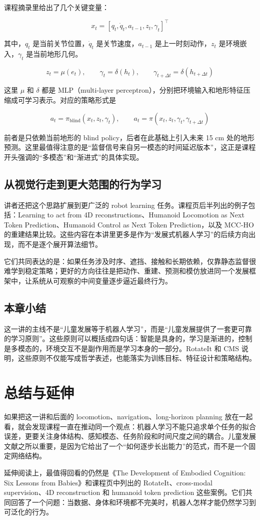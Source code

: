 \documentclass[a4paper]{article}
\begin{document}
课程摘录里给出了几个关键变量：

\[
x_t = [q_t, \dot q_t, a_{t-1}, z_t, \gamma_t]^\top
\]

其中，\(q_t\) 是当前关节位置，\(\dot q_t\) 是关节速度，\(a_{t-1}\) 是上一时刻动作，\(z_t\) 是环境嵌入，\(\gamma_t\) 是当前地形几何。

\[
z_t = \mu(e_t), \qquad \gamma_t = \delta(h_t), \qquad \gamma_{t+\Delta t} = \delta(h_{t+\Delta t})
\]

这里 \(\mu\) 和 \(\delta\) 都是 MLP（multi-layer perceptron），分别把环境输入和地形特征压缩成可学习表示。对应的策略形式是

\[
a_t = \pi_{\text{blind}}(x_t, z_t, \gamma_t), \qquad
a_t = \pi(x_t, z_t, \gamma_t, \gamma_{t+\Delta t})
\]

前者是只依赖当前地形的 blind policy，后者在此基础上引入未来 15 cm 处的地形预测。这里最值得注意的是“监督信号来自另一模态的时间延迟版本”，这正是课程开头强调的“多模态”和“渐进式”的具体实现。

\subsection{从视觉行走到更大范围的行为学习}
讲者还把这个思路扩展到更广泛的 robot learning 任务。课程页后半列出的例子包括：Learning to act from 4D reconstructions、Humanoid Locomotion as Next Token Prediction、Humanoid Control as Next Token Prediction，以及 MCC-HO 的重建结果比较。这些内容在本讲里更多是作为“发展式机器人学习”的后续方向出现，而不是逐个展开算法细节。

它们共同表达的是：如果任务涉及时序、遮挡、接触和长期依赖，仅靠静态监督很难学到稳定策略；更好的方向往往是把动作、重建、预测和模仿放进同一个发展框架中，让系统从可观察的中间变量逐步逼近最终行为。

\subsection{本章小结}
这一讲的主线不是“儿童发展等于机器人学习”，而是“儿童发展提供了一套更可靠的学习原则”。这些原则可以概括成四句话：智能是具身的，学习是渐进的，控制是多模态的，环境交互不是副作用而是学习本身的一部分。RotateIt 和 CMS 说明，这些原则不仅能写成哲学表述，也能落实为训练目标、特征设计和策略结构。

\section{总结与延伸}
如果把这一讲和后面的 locomotion、navigation、long-horizon planning 放在一起看，就会发现课程一直在推动同一个观点：机器人学习不能只追求单个任务的拟合误差，更要关注身体结构、感知模态、任务阶段和时间尺度之间的耦合。儿童发展文献之所以重要，是因为它给出了一个“如何逐步长出能力”的范式，而不是一个固定网络结构。

延伸阅读上，最值得回看的仍然是《The Development of Embodied Cognition: Six Lessons from Babies》和课程页中列出的 RotateIt、cross-modal supervision、4D reconstruction 和 humanoid token prediction 这些案例。它们共同回答了一个问题：当数据、身体和环境都不完美时，机器人怎样才能仍然学习到可泛化的行为。
\end{document}
